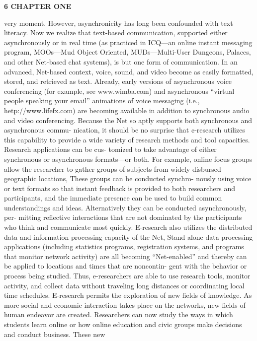 \documentclass [10pt,a4paper]{book}
\begin{document}
\begin{flushleft}
\textbf{6  CHAPTER ONE}
\end{flushleft}
very moment. However, asynchronicity has long been confounded with text literacy.
Now we realize that text-based communication, supported either asynchronously or in
real time (as practiced in ICQ—an online instant messaging program, MOOs—Mud
Object Oriented, MUDs—Multi-User Dungeons, Palaces, and other Net-based chat
systems), is but one form of communication. In an advanced, Net-based context, voice,
sound, and video become as easily formatted, stored, and retrieved as text. Already,
early versions of asynchronous voice conferencing (for example, see www.wimba.com)
and asynchronous “virtual people speaking your email” animations of voice messaging
(i.e., hetp://www.lifefx.com) are becoming available in addition to synchronous audio
and video conferencing.
Because the Net so aptly supports both synchronous and asynchronous commu-
nication, it should be no surprise that ¢-research utilizes this capability to provide a
wide variety of research methods and tool capacities. Research applications can be cus-
tomized to take advantage of either synchronous or asynchronous formats—or both.
For example, online focus groups allow the researcher to gather groups of subjects
from widely disbursed geographic locations, These groups can be conducted synchro-
nously using voice or text formats so that instant feedback is provided to both
researchers and participants, and the immediate presence can be used to build common
understandings and ideas. Alternatively they can be conducted asynchronously, per-
mitting reflective interactions that are not dominated by the participants who think
and communicate most quickly.
E-research also utilizes the distributed data and information processing capacity
of the Net, Stand-alone data processing applications (including statistics programs,
registration systems, and programs that monitor network activity) are all becoming
“Net-enabled” and thereby can be applied to locations and times that are noncontin-
gent with the behavior or process being studied. Thus, e-researchers are able to use
research tools, monitor activity, and collect data without traveling long distances or
coordinating local time schedules.
E-research permits the exploration of new fields of knowledge. As more social
and economic interaction takes place on the networks, new fields of human endeavor
are created. Researchers can now study the ways in which students learn online or how
online education and civic groups make decisions and conduct business. These new
\end{document}
